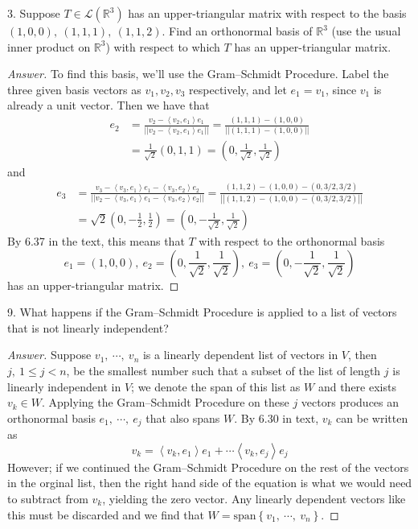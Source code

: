 \documentclass{article}
\newcommand{\norm}[1]{\left|\left|#1\right|\right|}
\newcommand{\parens}[1]{\left(#1\right)}
\newcommand{\bracks}[1]{\left\{#1\right\}}
\newcommand{\R}{\mathbb{R}}
\newcommand{\LT}{\mathcal{L}}
\newcommand{\abracks}[1]{\left< #1\right>}
\begin{document}
    \item[3.] Suppose $T \in \LT\parens{\R^3}$ has an upper-triangular
    matrix with respect to the basis $(1, 0, 0),\ (1, 1, 1),\ (1, 1, 2)$. 
    Find an orthonormal basis of $\R^3$ (use the usual inner product on 
    $\R^3$) with respect to which $T$ has an upper-triangular matrix.
    \begin{proof}[Answer]
    To find this basis, we'll use the Gram–Schmidt Procedure. Label the 
    three given basis vectors as $v_1, v_2, v_3$ respectively, and let 
    $e_1 = v_1$, since $v_1$ is already a unit vector. Then we have that 
    \begin{align*}
    e_2 &= \frac{v_2 - \abracks{v_2, e_1}e_1}{\norm{v_2 - 
    \abracks{v_2, e_1}e_1}} = \frac{(1,1,1) - (1,0,0)}{\norm{(1,1,1) - 
    (1,0,0)}} \\
    &= \frac{1}{\sqrt{2}}\parens{0,1,1} = \parens{0, \frac{1}{\sqrt{2}},
    \frac{1}{\sqrt{2}}}
    \end{align*}
    and 
    \begin{align*}
    e_3 &= \frac{v_3 - \abracks{v_3, e_1}e_1 - \abracks{v_3, e_2}e_2}{
    \norm{v_2 - \abracks{v_3, e_1}e_1- \abracks{v_3, e_2}e_2}} = 
    \frac{(1,1,2) - (1,0,0) - \parens{0, 3/2, 3/2}}
    {\norm{(1,1,2) - (1,0,0) - \parens{0, 3/2, 3/2}}} \\
    &= \sqrt{2}\parens{0,-\frac{1}{2},\frac{1}{2}} = 
    \parens{0, -\frac{1}{\sqrt{2}},\frac{1}{\sqrt{2}}}
    \end{align*}
    By 6.37 in the text, this means that $T$ with respect to the orthonormal
    basis
    $$e_1=(1,0,0),\ e_2=\parens{0, \frac{1}{\sqrt{2}}, \frac{1}{\sqrt{2}}},
    \ e_3=\parens{0, -\frac{1}{\sqrt{2}}, \frac{1}{\sqrt{2}}}$$
    has an upper-triangular matrix.
    \end{proof}
    
    \item[9.] What happens if the Gram–Schmidt Procedure is applied to a 
    list of vectors that is not linearly independent?
    \begin{proof}[Answer]
    Suppose $v_1,\ \cdots,\ v_n$ is a linearly dependent list of vectors
    in $V$, then $j,\ 1\leq j< n$, be the smallest number such that a 
    subset of the 
    list of length $j$ is linearly independent in $V$; we denote the span 
    of this list as $W$ and there exists $v_k \in W$. Applying the 
    Gram–Schmidt Procedure on these $j$ vectors produces an orthonormal
    basis $e_1,\ \cdots,\ e_j$ that also spans $W$. By 6.30 in text, $v_k$
    can be written as
    $$v_k = \abracks{v_k, e_1}e_1 + \cdots \abracks{v_k, e_j}e_j$$
    However; if we continued the Gram–Schmidt Procedure on the rest of 
    the vectors in the orginal list, then the right hand side of the 
    equation is what we would need to subtract from $v_k$, yielding
    the zero vector. Any linearly dependent vectors like this must be 
    discarded and we find that $W = \text{span}\bracks{v_1,\ \cdots,\ v_n}$.
    \end{proof}
\end{document}
